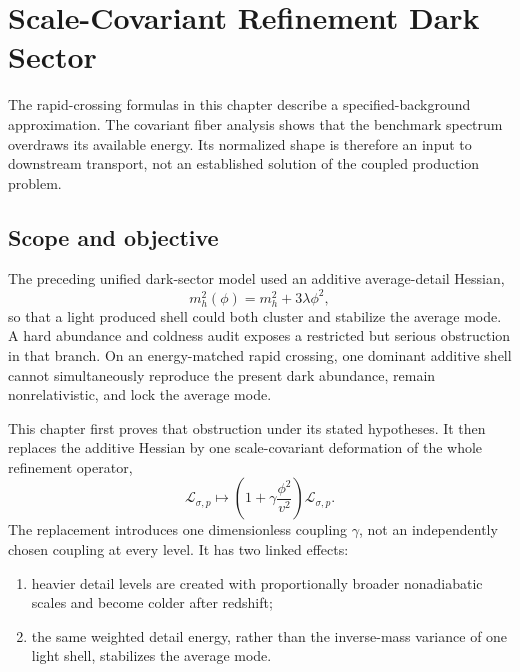 \chapter{Scale-Covariant Refinement Dark Sector}
\label{ch:scale-covariant-dark-sector}

\begin{monographnote}
The rapid-crossing formulas in this chapter describe a specified-background approximation. The covariant fiber analysis shows that the benchmark spectrum overdraws its available energy. Its normalized shape is therefore an input to downstream transport, not an established solution of the coupled production problem.
\end{monographnote}
\section{Scope and objective}

The preceding unified dark-sector model used an additive average-detail Hessian,
\begin{equation}
 m_h^2(\phi)=m_h^2+3\lambda\phi^2,
 \label{eq:scw-additive-mass}
\end{equation}
so that a light produced shell could both cluster and stabilize the average mode.  A hard abundance and coldness audit exposes a restricted but serious obstruction in that branch.  On an energy-matched rapid crossing, one dominant additive shell cannot simultaneously reproduce the present dark abundance, remain nonrelativistic, and lock the average mode.

This chapter first proves that obstruction under its stated hypotheses.  It then replaces the additive Hessian by one scale-covariant deformation of the whole refinement operator,
\begin{equation}
 \mathcal L_{\sigma,p}
 \longmapsto
 \left(1+\gamma\frac{\phi^2}{v^2}\right)\mathcal L_{\sigma,p}.
 \label{eq:scw-scale-covariant-rule}
\end{equation}
The replacement introduces one dimensionless coupling $\gamma$, not an independently chosen coupling at every level.  It has two linked effects:
\begin{enumerate}[leftmargin=2em]
\item heavier detail levels are created with proportionally broader nonadiabatic scales and become colder after redshift;
\item the same weighted detail energy, rather than the inverse-mass variance of one light shell, stabilizes the average mode.
\end{enumerate}

